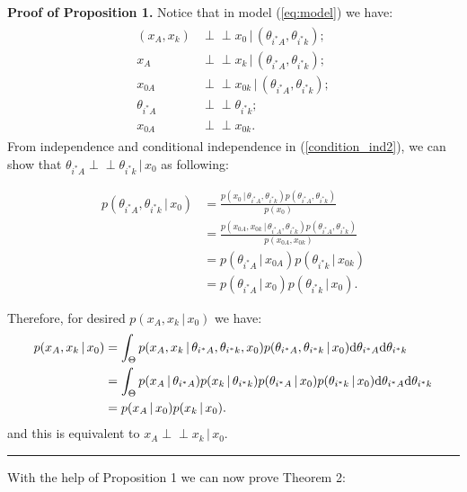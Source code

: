 \documentclass[12pt]{article}
\newenvironment{proof}[1][Proof]{\noindent\textbf{#1.} }{\ \rule{0.5em}{0.5em}}
\newcommand{\indep}{\perp \!\!\! \perp}
\begin{document}
\begin{proof}[Proof of Proposition 1]
Notice that in model (\ref{eq:model}) we have:
\begin{align}
\label{condition_ind2}
\begin{split}
    (x_A,x_k) &\indep x_0 \, | \, (\theta_{i^*A},\theta_{i^*k});\\
x_A &\indep x_k \,|\, (\theta_{i^*A},\theta_{i^*k});\\
x_{0A} &\indep x_{0k} \,|\, (\theta_{i^*A},\theta_{i^*k});\\
\theta_{i^*A} &\indep \theta_{i^*k};\\
x_{0A} &\indep x_{0k}.
\end{split}
\end{align}
From independence and conditional independence in (\ref{condition_ind2}), we can show that $\theta_{i^*A}\indep \theta_{i^*k}\, | \, x_0$ as following:

\begin{align*}
    p(\theta_{i^*A},\theta_{i^*k}\,|\,x_0)&=
    \frac{p(x_0\,|\,\theta_{i^*A},\theta_{i^*k})p(\theta_{i^*A},\theta_{i^*k})}{p(x_0)}\\
    &= \frac{p(x_{0A},x_{0k}\,|\,\theta_{i^*A},\theta_{i^*k})p(\theta_{i^*A},\theta_{i^*k})}{p(x_{0A},x_{0k})}\\
    &= p(\theta_{i^*A}\,|\,x_{0A})p(\theta_{i^*k}\,|\,x_{0k})\\
    &= p(\theta_{i^*A}\,|\,x_0)p(\theta_{i^*k}\,|\,x_0).
\end{align*}

Therefore, for desired $p(x_A,x_k\,|\,x_0)$ we have:
\begin{align}
\begin{split}
    p(x_A,x_k\,|\,x_0) &= \int_\Theta p(x_A,x_k\,|\,\theta_{i^*A},\theta_{i^*k},x_0)p(\theta_{i^*A},\theta_{i^*k}\,|\,x_0) {\rm d}\theta_{i^*A}{\rm d}\theta_{i^*k}\\
    &= \int_\Theta p(x_A\,|\,\theta_{i^*A})p(x_k\,|\,\theta_{i^*k})p(\theta_{i^*A}\,|\,x_0)p(\theta_{i^*k}\,|\,x_0){\rm d}\theta_{i^*A}{\rm d}\theta_{i^*k}\\
    &= p(x_A\,|\,x_0)p(x_k\,|\,x_0).
\end{split}
\end{align}
and this is equivalent to $x_A \indep x_k \, | \, x_0$.
\end{proof}

With the help of Proposition 1 we can now prove Theorem 2:
\end{document}
